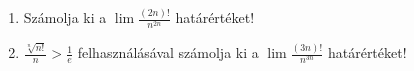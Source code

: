 \documentclass[11pt]{scrartcl}
\begin{document}
\begin{enumerate}
	\item Számolja ki a \(\displaystyle \lim \frac{(2n)!}{n^{2n}}\)
	      határértéket!

	\item \(\displaystyle \frac{\sqrt[n]{n!}}{n} > \frac{1}{e}\)
	      felhasználásával számolja ki a
	      \(\displaystyle \lim \frac{(3n)!}{n^{3n}}\) határértéket!
\end{enumerate}
\end{document}
